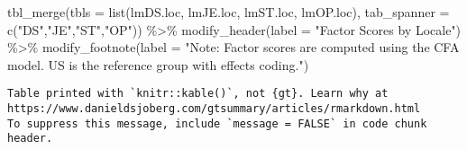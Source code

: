 \documentclass[
  letterpaper,
  DIV=11,
  numbers=noendperiod]{scrartcl}
\newenvironment{Shaded}{\begin{snugshade}}{\end{snugshade}}
\newcommand{\AttributeTok}[1]{\textcolor[rgb]{0.40,0.45,0.13}{#1}}
\newcommand{\FunctionTok}[1]{\textcolor[rgb]{0.28,0.35,0.67}{#1}}
\newcommand{\NormalTok}[1]{\textcolor[rgb]{0.00,0.23,0.31}{#1}}
\newcommand{\SpecialCharTok}[1]{\textcolor[rgb]{0.37,0.37,0.37}{#1}}
\newcommand{\StringTok}[1]{\textcolor[rgb]{0.13,0.47,0.30}{#1}}
\begin{document}
\begin{Shaded}
\begin{Highlighting}[]
\FunctionTok{tbl\_merge}\NormalTok{(}\AttributeTok{tbls =} \FunctionTok{list}\NormalTok{(lmDS.loc, lmJE.loc, lmST.loc, lmOP.loc),}
          \AttributeTok{tab\_spanner =} \FunctionTok{c}\NormalTok{(}\StringTok{"DS"}\NormalTok{,}\StringTok{"JE"}\NormalTok{,}\StringTok{"ST"}\NormalTok{,}\StringTok{"OP"}\NormalTok{)) }\SpecialCharTok{\%\textgreater{}\%}
  \FunctionTok{modify\_header}\NormalTok{(}\AttributeTok{label =} \StringTok{"Factor Scores by Locale"}\NormalTok{) }\SpecialCharTok{\%\textgreater{}\%}
  \FunctionTok{modify\_footnote}\NormalTok{(}\AttributeTok{label =} \StringTok{"Note: Factor scores are computed using the CFA model.  US is the reference group with effects coding."}\NormalTok{)}
\end{Highlighting}
\end{Shaded}

\begin{verbatim}
Table printed with `knitr::kable()`, not {gt}. Learn why at
https://www.danieldsjoberg.com/gtsummary/articles/rmarkdown.html
To suppress this message, include `message = FALSE` in code chunk header.
\end{verbatim}
\end{document}
